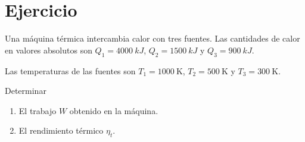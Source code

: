 \section{Ejercicio}\label{ej:Chap07Ejercicio03}
Una máquina térmica intercambia calor con tres fuentes. Las cantidades de calor en valores absolutos son $Q_1=\SI{4000}{kJ}$, $Q_2=\SI{1500}{kJ}$ y $Q_3=\SI{900}{kJ}$.

Las temperaturas de las fuentes son $T_1=\SI{1000}{\kelvin}$, $T_2=\SI{500}{\kelvin}$ y $T_3=\SI{300}{\kelvin}$.

Determinar
\begin{enumerate}
    \item El trabajo $W$ obtenido en la máquina.
    \item El rendimiento térmico $\eta_t$.
\end{enumerate}